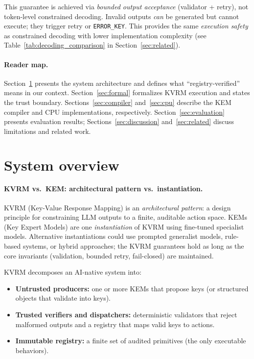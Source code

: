 \documentclass[11pt]{article}
\begin{document}
\begin{center}
\end{center}

\noindent This guarantee is achieved via \emph{bounded output acceptance} (validator + retry), not token-level constrained decoding. Invalid outputs \emph{can} be generated but cannot execute; they trigger retry or \texttt{ERROR\_KEY}. This provides the same \emph{execution safety} as constrained decoding with lower implementation complexity (see Table~\ref{tab:decoding_comparison} in Section~\ref{sec:related}).

\paragraph{Reader map.}
Section~\ref{sec:overview} presents the system architecture and defines what ``registry-verified'' means in our context.
Section~\ref{sec:formal} formalizes KVRM execution and states the trust boundary.
Sections~\ref{sec:compiler} and~\ref{sec:cpu} describe the KEM compiler and CPU implementations, respectively.
Section~\ref{sec:evaluation} presents evaluation results; Sections~\ref{sec:discussion} and~\ref{sec:related} discuss limitations and related work.

\section{System overview}\label{sec:overview}

\paragraph{KVRM vs.\ KEM: architectural pattern vs.\ instantiation.}
KVRM (Key-Value Response Mapping) is an \emph{architectural pattern}: a design principle for constraining LLM outputs to a finite, auditable action space.
KEMs (Key Expert Models) are one \emph{instantiation} of KVRM using fine-tuned specialist models.
Alternative instantiations could use prompted generalist models, rule-based systems, or hybrid approaches; the KVRM guarantees hold as long as the core invariants (validation, bounded retry, fail-closed) are maintained.

KVRM decomposes an AI-native system into:
\begin{itemize}[leftmargin=*]
  \item \textbf{Untrusted producers:} one or more KEMs that propose keys (or structured objects that validate into keys).
  \item \textbf{Trusted verifiers and dispatchers:} deterministic validators that reject malformed outputs and a registry that maps valid keys to actions.
  \item \textbf{Immutable registry:} a finite set of audited primitives (the only executable behaviors).
\end{itemize}
\end{document}
